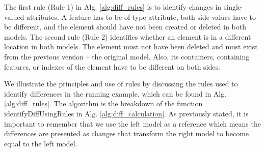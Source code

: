 The first rule (Rule 1) in Alg. \ref{alg:diff_rules} is to identify changes in single-valued attributes. A feature has to be of type \textsf{attribute}, both side values have to be different, and the element should have not been created or deleted in both models. The second rule (Rule 2) identifies whether an element is in a different location in both models. The element must not have been deleted and must exist from the previous version -- the original model. Also, its containers, containing features, or indexes of the element have to be different on both sides.

We illustrate the principles and use of rules by discussing the rules used to identify differences in the running example, which can be found in Alg. \ref{alg:diff_rules}. The algorithm is the breakdown of the function \textsf{identifyDiffUsingRules} in Alg. \ref{alg:diff_calculation}. As previously stated, it is important to remember that we use the left model as a reference which means the differences are presented as changes that transform the right model to become equal to the left model. 

